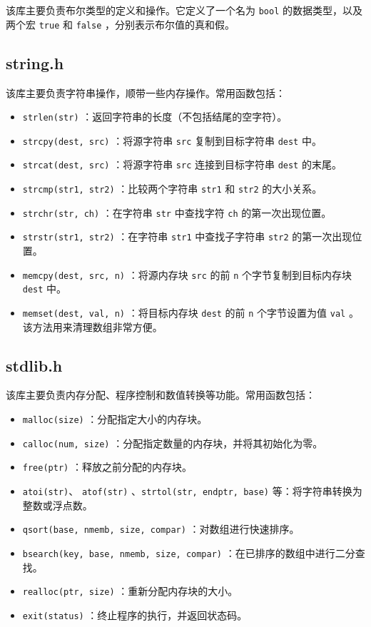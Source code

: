 该库主要负责布尔类型的定义和操作。它定义了一个名为 \texttt{bool} 的数据类型，以及两个宏 \texttt{true} 和 \texttt{false} ，分别表示布尔值的真和假。

\subsection{string.h}

该库主要负责字符串操作，顺带一些内存操作。常用函数包括：
\begin{itemize}
  \item \texttt{strlen(str)} ：返回字符串的长度（不包括结尾的空字符）。
  \item \texttt{strcpy(dest, src)} ：将源字符串 \texttt{src} 复制到目标字符串 \texttt{dest} 中。
  \item \texttt{strcat(dest, src)} ：将源字符串 \texttt{src} 连接到目标字符串 \texttt{dest} 的末尾。
  \item \texttt{strcmp(str1, str2)} ：比较两个字符串 \texttt{str1} 和 \texttt{str2} 的大小关系。
  \item \texttt{strchr(str, ch)} ：在字符串 \texttt{str} 中查找字符 \texttt{ch} 的第一次出现位置。
  \item \texttt{strstr(str1, str2)} ：在字符串 \texttt{str1} 中查找子字符串 \texttt{str2} 的第一次出现位置。
  \item \texttt{memcpy(dest, src, n)} ：将源内存块 \texttt{src} 的前 \texttt{n} 个字节复制到目标内存块 \texttt{dest} 中。
  \item \texttt{memset(dest, val, n)} ：将目标内存块 \texttt{dest} 的前 \texttt{n} 个字节设置为值 \texttt{val} 。该方法用来清理数组非常方便。
\end{itemize}

\subsection{stdlib.h}

该库主要负责内存分配、程序控制和数值转换等功能。常用函数包括：
\begin{itemize}
  \item \texttt{malloc(size)} ：分配指定大小的内存块。
  \item \texttt{calloc(num, size)} ：分配指定数量的内存块，并将其初始化为零。
  \item \texttt{free(ptr)} ：释放之前分配的内存块。
  \item \texttt{atoi(str)}、 \texttt{atof(str)} 、\texttt{strtol(str, endptr, base)} 等：将字符串转换为整数或浮点数。
  \item \texttt{qsort(base, nmemb, size, compar)} ：对数组进行快速排序。
  \item \texttt{bsearch(key, base, nmemb, size, compar)} ：在已排序的数组中进行二分查找。
  \item \texttt{realloc(ptr, size)} ：重新分配内存块的大小。
  \item \texttt{exit(status)} ：终止程序的执行，并返回状态码。
\end{itemize}

